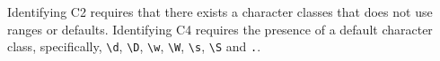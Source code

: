 Identifying C2 requires that there exists a character classes that does not use ranges or defaults. 
Identifying C4 requires the presence of a default character class, specifically, \verb!\d!, \verb!\D!, \verb!\w!, \verb!\W!, \verb!\s!, \verb!\S! and \verb!.!. 

